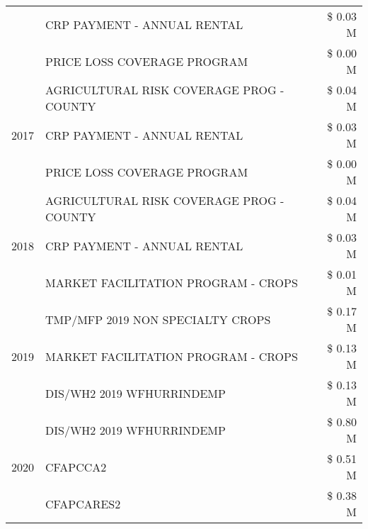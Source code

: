 \begin{tabular}{llr}
 & CRP PAYMENT - ANNUAL RENTAL & \$ 0.03 M \\
 & PRICE LOSS COVERAGE PROGRAM & \$ 0.00 M \\
\cline{1-3}
\multirow[t]{3}{*}{2017} & AGRICULTURAL RISK COVERAGE PROG - COUNTY & \$ 0.04 M \\
 & CRP PAYMENT - ANNUAL RENTAL & \$ 0.03 M \\
 & PRICE LOSS COVERAGE PROGRAM & \$ 0.00 M \\
\cline{1-3}
\multirow[t]{3}{*}{2018} & AGRICULTURAL RISK COVERAGE PROG - COUNTY & \$ 0.04 M \\
 & CRP PAYMENT - ANNUAL RENTAL & \$ 0.03 M \\
 & MARKET FACILITATION PROGRAM - CROPS & \$ 0.01 M \\
\cline{1-3}
\multirow[t]{3}{*}{2019} & TMP/MFP 2019 NON SPECIALTY CROPS & \$ 0.17 M \\
 & MARKET FACILITATION PROGRAM - CROPS & \$ 0.13 M \\
 & DIS/WH2 2019 WFHURRINDEMP & \$ 0.13 M \\
\cline{1-3}
\multirow[t]{3}{*}{2020} & DIS/WH2 2019 WFHURRINDEMP & \$ 0.80 M \\
 & CFAPCCA2 & \$ 0.51 M \\
 & CFAPCARES2 & \$ 0.38 M \\
\cline{1-3}
\bottomrule
\end{tabular}
